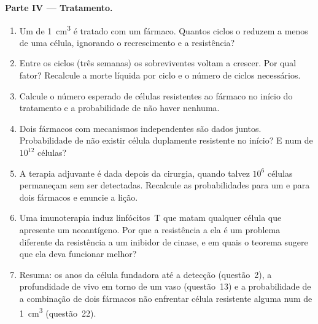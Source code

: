 \begin{problem}
\medskip
\noindent\textbf{Parte IV --- Tratamento.}
\begin{enumerate}[resume]
  \item Um  de \qty{1}{cm^3} é tratado com um fármaco. Quantos
        ciclos o reduzem a menos de uma célula, ignorando o
        recrescimento e a resistência?
  \item Entre os ciclos (três semanas) os sobreviventes voltam a
        crescer. Por qual fator? Recalcule a morte líquida por ciclo e o
        número de ciclos necessários.
  \item Calcule o número esperado de células resistentes ao fármaco no
        início do tratamento e a probabilidade de não haver nenhuma.
  \item Dois fármacos com mecanismos independentes são dados juntos.
        Probabilidade de não existir célula duplamente resistente no
        início? E num  de $10^{12}$ células?
  \item A terapia adjuvante é dada depois da cirurgia, quando talvez
        $10^{6}$ células permaneçam sem ser detectadas. Recalcule as
        probabilidades para um e para dois fármacos e enuncie a lição.
  \item Uma imunoterapia induz linfócitos~T que matam qualquer célula
        que apresente um neoantígeno. Por que a resistência a ela é um
        problema diferente da resistência a um inibidor de cinase, e em
        quais  o teorema sugere que ela deva funcionar melhor?
  \item Resuma: os anos da célula fundadora até a detecção (questão~2),
        a profundidade de  vivo em torno de um vaso (questão~13) e
        a probabilidade de a combinação de dois fármacos não enfrentar
        célula resistente alguma num  de \qty{1}{cm^3}
        (questão~22).
\end{enumerate}
\end{problem}
